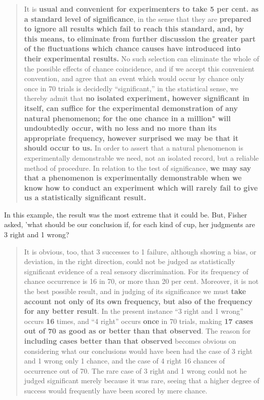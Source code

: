 \documentclass[]{book}
\begin{document}
\begin{quote}
It is \textbf{usual and convenient for experimenters to take 5 per cent. as a standard level of significance}, in the sense that they are \textbf{prepared to ignore all results which fail to reach this standard, and, by this means, to eliminate from further discussion the greater part of the fluctuations which chance causes have introduced into their experimental results.} No such selection can eliminate the whole of the possible effects of chance coincidence, and if we accept this convenient convention, and agree that an event which would occur by chance only once in 70 trials is decidedly ``significant,'' in the statistical sense, we thereby admit that \textbf{no isolated experiment, however significant in itself, can suffice for the experimental demonstration of any natural phenomenon; for the one chance in a million" will undoubtedly occur, with no less and no more than its appropriate frequency, however surprised we may be that it should occur to us.} In order to assert that a natural phenomenon is experimentally demonstrable we need, not an isolated record, but a reliable method of procedure. In relation to the test of significance, \textbf{we may say that a phenomenon is experimentally demonstrable when we know how to conduct an experiment which will rarely fail to give us a statistically significant result.}
\end{quote}

In this example, the result was the most extreme that it could be.
But, Fisher asked, 'what should be our conclusion if, for each kind of cup, her judgments are 3 right and 1 wrong?

\begin{quote}
It is obvious, too, that 3 successes to 1 failure, although showing a bias, or deviation, in the right direction, could not be judged as statistically significant evidence of a real sensory discrimination. For its frequency of chance occurrence is 16 in 70, or more than 20 per cent. Moreover, it is not the best possible result, and in judging of its significance we must \textbf{take account not only of its own frequency, but also of the frequency for any better result}. In the present instance ``3 right and 1 wrong'' occurs \textbf{16} times, and ``4 right'' occurs \textbf{once} in 70 trials, making \textbf{17 cases out of 70 as good as or better than that observed}. The reason for \textbf{including cases better than that observed} becomes obvious on considering what our conclusions would have been had the case of 3 right and 1 wrong only 1 chance, and the case of 4 right 16 chances of occurrence out of 70. The rare case of 3 right and 1 wrong could not he judged significant merely because it was rare, seeing that a higher degree of success would frequently have been scored by mere chance.
\end{quote}
\end{document}
